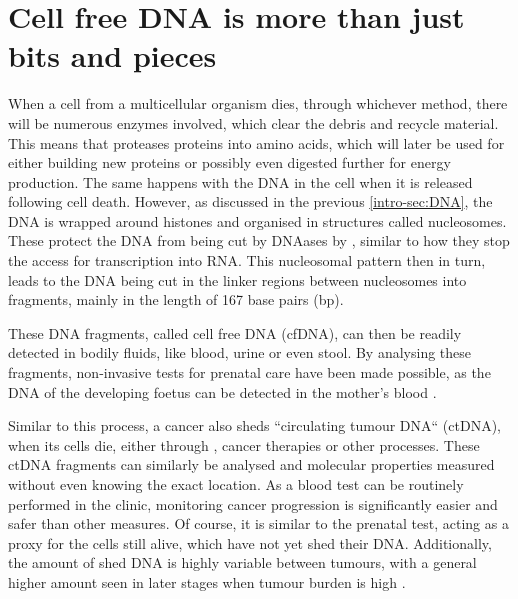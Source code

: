 \section[cfDNA]{Cell free DNA is more than just bits and pieces}
\label{intro-sec:ctDNA}

When a cell from a multicellular organism dies, through whichever method, there will be numerous enzymes involved, which clear the debris and recycle material. This  means that proteases  proteins into amino acids, which will later be used for either building new proteins or possibly even digested further for energy production. The same happens with the DNA in the cell when it is released following cell death. However, as discussed in the previous \autoref{intro-sec:DNA}, the DNA is wrapped around histones and organised in structures called nucleosomes. These protect the DNA from being cut by DNAases by , similar to how they stop the access for transcription into RNA. This nucleosomal pattern then in turn, leads to the DNA being cut in the linker regions between nucleosomes into fragments, mainly in the length of 167 base pairs (bp). 

These DNA fragments, called cell free DNA (cfDNA), can then be readily detected in bodily fluids, like blood, urine or even stool. By analysing these fragments, non-invasive tests for prenatal care have been made possible, as the DNA of the developing foetus can be detected in the mother's blood \cite{Dan2012,Nicolaides2013}.

Similar to this process, a cancer also sheds ``circulating tumour DNA`` (ctDNA), when its cells die, either through , cancer therapies or other processes. These ctDNA fragments can similarly be analysed and molecular properties measured without even knowing the  exact location. As a blood test can be routinely performed in the clinic, monitoring cancer progression is significantly easier and safer  than other measures. Of course, it is similar to the prenatal test, acting as a proxy for the cells still alive, which have not yet shed their DNA. Additionally, the amount of shed DNA is highly variable between tumours, with a general higher amount seen in later stages when  tumour burden is high \cite{Diehl2008,Schwarzenbach2011}. 

